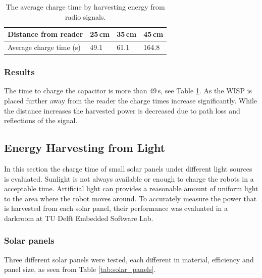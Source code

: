 \begin{table}[t]
	\centering
	\caption{The average charge time by harvesting energy from radio signals.}
	\label{tab:res_rf_harvest}
	\begin{tabular}{|l||l|l|l|}
		\hline
		Distance from reader & 25\,cm & 35\,cm & 45\,cm \\
		\hline \hline
		Average charge time (s) & 49.1 & 61.1 & 164.8 \\
		\hline
	\end{tabular}
\end{table}

\subsubsection{Results}
The time to charge the capacitor is more than 49\,s, see Table \ref{tab:res_rf_harvest}.
As the WISP is placed further away from the reader the charge times increase significantly.
While the distance increases the harvested power is decreased due to path loss and reflections of the signal.

\subsection{Energy Harvesting from Light}

In this section the charge time of small solar panels under different light sources is evaluated.
Sunlight is not always available or enough to charge the robots in a acceptable time.
Artificial light can provides a reasonable amount of uniform light to the area where the robot moves around.
To accurately measure the power that is harvested from each solar panel, their performance was evaluated in a darkroom at TU Delft Embedded Software Lab.

\subsubsection{Solar panels}
Three different solar panels were tested, each different in material, efficiency and panel size, as seen from Table \ref{tab:solar_panels}.

